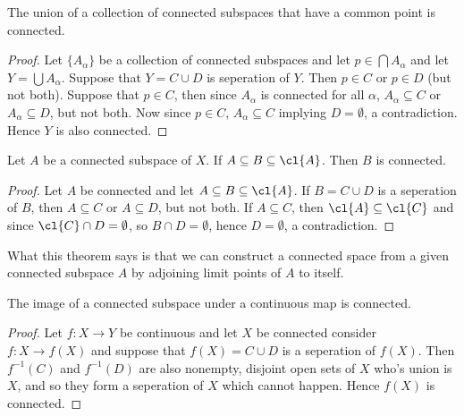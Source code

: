 \begin{theorem}\label{3.1.4}
    The union of a collection of connected subspaces that have a common point is connected.
\end{theorem}
\begin{proof}
    Let $\{A_{\alpha}\}$ be a collection of connected subspaces and let $p \in \bigcap{A_{\alpha}}$
    and let $Y=\bigcup{A_{\alpha}}$. Suppose that $Y=C \cup D$ is seperation of  $Y$. Then  $p \in
    C$ or  $p \in D$  (but not both). Suppose that $p \in C$, then since $A_{\alpha}$ is connected
    for all $\alpha$,  $A_{\alpha} \subseteq C$ or $A_{\alpha} \subseteq D$, but not both. Now since
    $p \in C$,  $A_{\alpha} \subseteq C$ implying $D=\emptyset$, a contradiction. Hence  $Y$ is also
    connected.
\end{proof}

\begin{theorem}\label{3.1.5}
    Let $A$ be a connected subspace of  $X$. If  $A \subseteq B \subseteq \cl{A}$.
    Then $B$ is connected.
\end{theorem}
\begin{proof}
    Let $A$ be connected and let  $A \subseteq B \subseteq \cl{A}$. If $B=C \cup D$ is a seperation
    of  $B$, then  $A \subseteq C$ or  $A \subseteq D$, but not both. If  $A \subseteq C$, then
    $\cl{A} \subseteq \cl{C}$ and since $\cl{C} \cap D=\emptyset$, so $B \cap D=\emptyset$, hence
    $D=\emptyset$, a contradiction.
\end{proof}
\begin{remark}
    What this theorem says is that we can construct a connected space from a given connected
    subspace $A$ by adjoining limit points of $A$ to itself.
\end{remark}

\begin{theorem}\label{3.1.6}
    The image of a connected subspace under a continuous map is connected.
\end{theorem}
\begin{proof}
    Let $f:X \rightarrow Y$ be continuous and let $X$ be connected consider
    $f:X \rightarrow f(X)$ and suppose that $f(X)=C \cup D$ is a seperation of $f(X)$. Then
    $f^{-1}(C)$ and $f^{-1}(D)$ are also nonempty, disjoint open sets of $X$ who's union is  $X$,
    and so they form a seperation of  $X$ which cannot happen. Hence  $f(X)$ is connected.
\end{proof}

